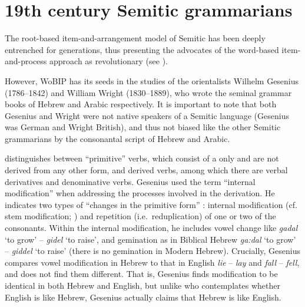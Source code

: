 \documentclass[output=paper,
modfonts
]{LSP/langsci}
\begin{document}
\section{19th century Semitic grammarians}\label{th-century-semitic-grammarians}\label{sec:batel:6}

The root-based item-and-arrangement model of Semitic  has been
deeply entrenched for generations, thus presenting the advocates of the
word-based item-and-process approach as revolutionary (see \citealt{horvath1981a, lederman1982a, heath1987a, hammond1988a, mccarthy1990a, Batel1994, batel2002a, batel2003a, ratcliffe1997a, Ussishkin1999, Ussishkin2000, Ussishkin2005, laks2011a, laks2015a, lev2016}).

However, WoBIP has its seeds in the studies of the orientalists Wilhelm
Gesenius (1786--1842) and William Wright (1830--1889), who wrote the
seminal grammar books of Hebrew and Arabic respectively. It is important
to note that both Gesenius and Wright were not native speakers of a
Semitic language (Gesenius was German and Wright British), and thus not
biased like the other Semitic grammarians by the consonantal script of
Hebrew and Arabic.

\citet{gesenius1813a} distinguishes between ``primitive'' verbs, which
consist of a  only and are not derived from any other form, and
derived verbs, among which there are verbal derivatives and denominative
verbs. Gesenius used the term ``internal modification'' when addressing
the processes involved in the derivation. He indicates two types of
``changes in the primitive form'' \citep[115]{gesenius1813a}: internal modification (cf.
stem modification; ) and repetition (i.e.\ reduplication) of one or
two of the  consonants. Within the internal modification, he
includes vowel change like \emph{gadal} `to grow' -- \emph{gidel} `to
raise', and gemination as in Biblical Hebrew \emph{ga:dal} `to grow' --
\emph{giddel} `to raise' (there is no gemination in Modern Hebrew).
Crucially, Gesenius compares vowel modification in Hebrew to that in
English \emph{lie} -- \emph{lay} and \emph{fall} -- \emph{fell}, and
does not find them different. That is, Gesenius finds  modification
to be identical in both Hebrew and English, but unlike \citet{anderson1992}
who contemplates whether English is like Hebrew, Gesenius actually
claims that Hebrew is like English.
\end{document}
